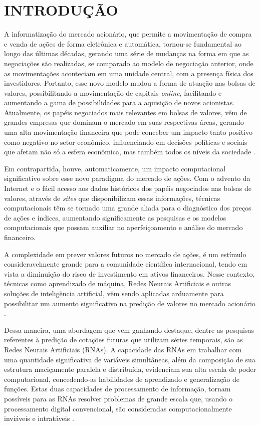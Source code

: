 
\chapter{INTRODUÇÃO}\label{ch:introducao}

A informatização do mercado acionário, que permite a movimentação de compra e venda de ações de forma eletrônica e automática, tornou-se fundamental ao longo das últimas décadas, gerando uma série de mudanças na forma em que as negociações são realizadas, se comparado ao modelo de negociação anterior, onde as movimentações aconteciam em uma unidade central, com a presença física dos investidores. Portanto, esse novo modelo mudou a forma de atuação nas bolsas de valores, possibilitando a movimentação de capitais \textit{online}, facilitando e aumentando a gama de possibilidades para a aquisição de novos acionistas. Atualmente, os papéis negociados mais relevantes em bolsas de valores, vêm de grandes empresas que dominam o mercado em suas respectivas áreas, gerando uma alta movimentação financeira que pode conceber um impacto tanto positivo como negativo no setor econômico, influenciando em decisões políticas e sociais que afetam não só a esfera econômica, mas também todos os níveis da sociedade \cite{shiller}.

Em contrapartida, houve, automaticamente, um impacto computacional significativo sobre esse novo paradigma do mercado de ações. Com o advento da Internet e o fácil acesso aos dados históricos dos papéis negociados nas bolsas de valores, através de     \textit{sites} que disponibilizam essas informações, técnicas computacionais têm se tornado uma grande aliada para o diagnóstico dos preços de ações e índices, aumentando significamente as pesquisas e os modelos computacionais que possam auxiliar no aperfeiçoamento e análise do mercado financeiro.

A complexidade em prever valores futuros no mercado de ações, é um estímulo consideravelmente grande para a comunidade científica internacional, tendo em vista a diminuição do risco de investimento em ativos financeiros. Nesse contexto, técnicas como aprendizado de máquina, Redes Neurais Artificiais  e outras soluções de inteligência artificial, vêm sendo aplicadas arduamente para possibilitar um aumento significativo na predição de valores no mercado acionário \cite{gambogi}.

Dessa maneira, uma abordagem que vem ganhando destaque, dentre as pesquisas referentes à predição de cotações futuras que utilizam séries temporais, são as Redes Neurais Artificiais (RNAs). A capacidade das RNAs em trabalhar com uma quantidade significativa de variáveis simultâneas, além da composição de sua estrutura maciçamente paralela e distribuída, evidenciam sua alta escala de poder computacional, concedendo-as habilidades de aprendizado e generalização de funções. Estas duas capacidades de processamento de informação, tornam possíveis para as RNAs resolver problemas de grande escala que, usando o processamento digital convencional, são consideradas computacionalmente inviáveis e intratáveis \cite{elpink, haykin2000}.


